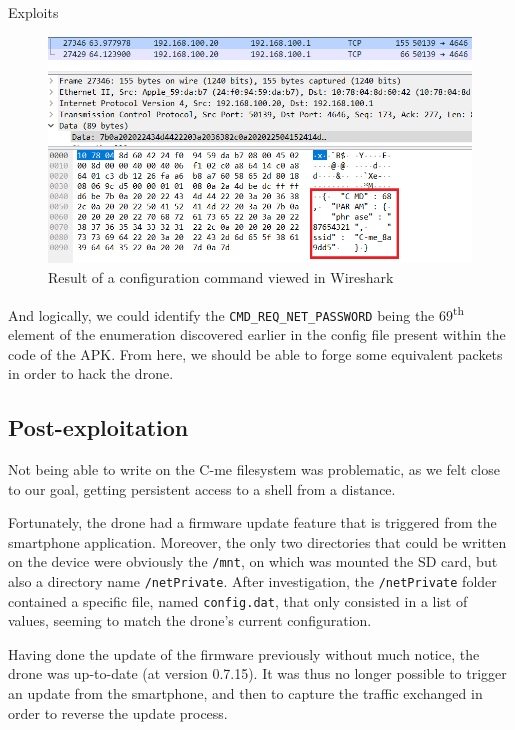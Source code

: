 \begin{chaptercover}{Exploits}
\begin{figure}[H]
  \centering
  \includegraphics[width=\linewidth]{figures/config-command}
  \caption{Result of a configuration command viewed in Wireshark}
  \label{fig:config-command}
\end{figure}

And logically, we could identify the \texttt{CMD\_REQ\_NET\_PASSWORD} being the 69\textsuperscript{th} element of the enumeration discovered earlier in the config file present within the code of the APK. From here, we should be able to forge some equivalent packets in order to hack the drone.

\subsection{Post-exploitation}\label{subsec:post-exploitation}

Not being able to write on the C-me filesystem was problematic, as we felt close to our goal, getting persistent access to a shell from a distance.

Fortunately, the drone had a firmware update feature that is triggered from the smartphone application. Moreover, the only two directories that could be written on the device were obviously the \texttt{/mnt}, on which was mounted the SD card, but also a directory name \texttt{/netPrivate}. After investigation, the \texttt{/netPrivate} folder contained a specific file, named \texttt{config.dat}, that only consisted in a list of values, seeming to match the drone’s current configuration. 

Having done the update of the firmware previously without much notice, the drone was up-to-date (at version 0.7.15). It was thus no longer possible to trigger an update from the smartphone, and then to capture the traffic exchanged in order to reverse the update process.


\end{chaptercover}

